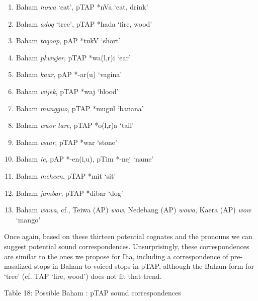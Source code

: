 \begin{enumerate}
\item Baham \textit{nowa} {\textquoteleft}eat{\textquoteright}, pTAP *nVa {\textquoteleft}eat, drink{\textquoteright}
\item Baham \textit{adoq} {\textquoteleft}tree{\textquoteright}, pTAP *hada {\textquoteleft}fire, wood{\textquoteright}
\item Baham \textit{toqoop}, pAP *tukV {\textquoteleft}short{\textquoteright}
\item Baham \textit{pkwujer}, pTAP *wa(l,r)i {\textquoteleft}ear{\textquoteright}
\item Baham \textit{kaar}, pAP *-ar(u) {\textquoteleft}vagina{\textquoteright}
\item Baham \textit{wijek}, pTAP *waj {\textquoteleft}blood{\textquoteright}
\item Baham \textit{mungguo}, pTAP *mugul {\textquoteleft}banana{\textquoteright}
\item Baham \textit{wuor tare}, pTAP *o(l,r)a {\textquoteleft}tail{\textquoteright}
\item Baham \textit{waar}, pTAP *war {\textquoteleft}stone{\textquoteright}
\item Baham \textit{{\textltailn}ie}, pAP *-en(i,u), pTim *-nej {\textquoteleft}name{\textquoteright}
\item Baham \textit{meheen}, pTAP *mit {\textquoteleft}sit{\textquoteright}
\item Baham \textit{jambar}, pTAP *dibar {\textquoteleft}dog{\textquoteright}
\item Baham \textit{wawa}, cf., Teiwa (AP) \textit{wow}, Nedebang (AP) \textit{wowa}, Kaera (AP) \textit{wow} {\textquoteleft}mango{\textquoteright}
\end{enumerate}
Once again, based on these thirteen potential cognates and the pronouns we can suggest potential sound correspondences. Unsurprisingly, these correspondences are similar to the ones we propose for Iha, including a correspondence of pre-nasalized stops in Baham to voiced stops in pTAP, although the Baham form for {\textquoteleft}tree{\textquoteright} (cf. TAP {\textquoteleft}fire, wood{\textquoteright}) does not fit that trend. 

{\centering
Table 18: Possible Baham : pTAP sound correspondences
\par}

